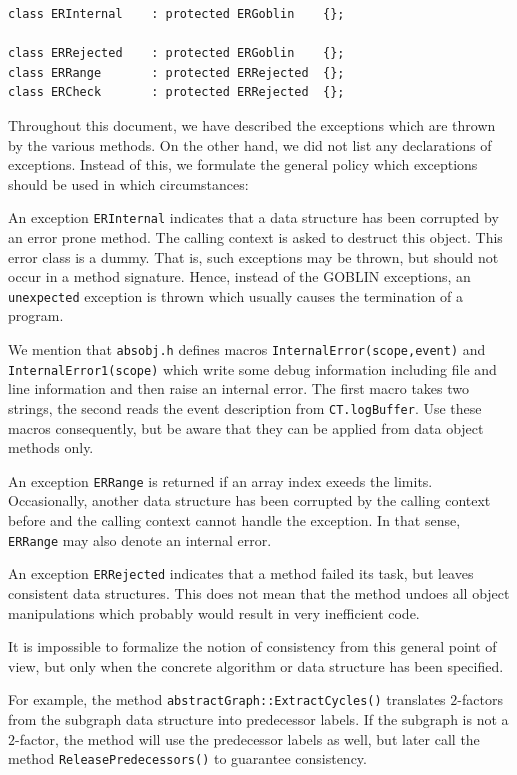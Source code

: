 \documentclass[a4paper,11pt,twoside]{book}
\begin{document}
\begin{multicols}{2}
\begin{mymethods}
\begin{verbatim}
class ERInternal    : protected ERGoblin    {};

class ERRejected    : protected ERGoblin    {};
class ERRange       : protected ERRejected  {};
class ERCheck       : protected ERRejected  {};

\end{verbatim}
\end{mymethods}
Throughout this document, we have described the exceptions which are thrown by
the various methods. On the other hand, we did not list any declarations of
exceptions. Instead of this, we formulate the general policy which exceptions
should be used in which circumstances:

An exception \verb/ERInternal/ indicates that a data structure has been
corrupted by an error prone method. The calling context is asked to destruct
this object. This error class is a dummy. That is, such exceptions may be
thrown, but should not occur in a method signature. Hence, instead of the
GOBLIN exceptions, an \verb/unexpected/ exception is thrown which usually
causes the termination of a program.

We mention that \verb/absobj.h/ defines macros \verb/InternalError(scope,event)/
and \verb/InternalError1(scope)/ which write some debug information including
file and line information and then raise an internal error. The first macro
takes two strings, the second reads the event description from
\verb/CT.logBuffer/. Use these macros consequently, but be aware that they can
be applied from data object methods only.

An exception \verb/ERRange/ is returned if an array index exeeds the limits.
Occasionally, another data structure has been corrupted by the calling context
before and the calling context cannot handle the exception. In that sense,
\verb/ERRange/ may also denote an internal error.

An exception \verb/ERRejected/ indicates that a method failed its task, but
leaves consistent data structures. This does not mean that the method undoes
all object manipulations which probably would result in very inefficient code.

It is impossible to formalize the notion of consistency from this general point
of view, but only when the concrete algorithm or data structure has been
specified.

For example, the method \verb/abstractGraph::ExtractCycles()/ translates
$2$-factors from the subgraph data structure into predecessor labels. If the
subgraph is not a $2$-factor, the method will use the predecessor labels as
well, but later call the method \verb/ReleasePredecessors()/ to guarantee
consistency.


\end{multicols}
\end{document}
